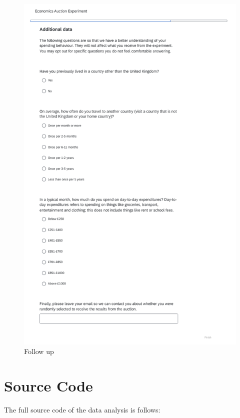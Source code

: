 \documentclass[
]{report}
\begin{document}
\begin{figure}[H]

{\centering \includegraphics{experiment_instructions/follow_up.png}

}

\caption{Follow up}

\end{figure}%

\section{Source Code}\label{source-code}

The full source code of the data analysis is follows:
\end{document}
